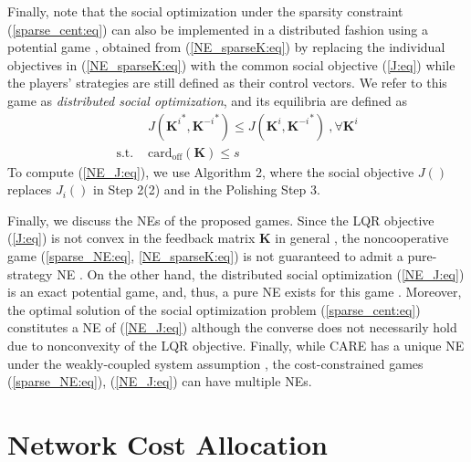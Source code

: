 \documentclass[12pt, draftclsnofoot,onecolumn]{IEEEtran}
\begin{document}
Finally, note that the social optimization under the sparsity constraint (\ref{sparse_cent:eq}) can also be implemented in a distributed fashion using a potential game \cite{li2013designing}, obtained from (\ref{NE_sparseK:eq}) by replacing the individual objectives in (\ref{NE_sparseK:eq}) with the common social objective (\ref{J:eq}) while the players' strategies are still defined as their control vectors. We refer to this game as {\it distributed social optimization}, and its equilibria are defined as
\begin{align}
&J({{\boldsymbol K}^{i}}^*,{{\boldsymbol K}^{-i}}^*) \leq J({\boldsymbol K}^{i},{{\boldsymbol K}^{-i}}^*) ~,\forall {\boldsymbol K}^{i}\nonumber\\
\mbox{s.t. } & \mathrm{card}_{\mathrm{off}}({\boldsymbol K}) \leq s 
\label{NE_J:eq}
\end{align}
\noindent To compute (\ref{NE_J:eq}), we use Algorithm 2, where the social objective $J()$ replaces $J_i()$ in Step 2(2) and in the Polishing Step 3. 


Finally, we discuss the NEs of the proposed games. Since the LQR objective (\ref{J:eq}) is not convex in the feedback matrix $\boldsymbol{K}$ in general \cite{rautert1997computational}, the noncooperative game (\ref{sparse_NE:eq}, \ref{NE_sparseK:eq}) is not guaranteed to admit a pure-strategy NE \cite{pang2011nonconvex}. On the other hand, the distributed social optimization (\ref{NE_J:eq}) is an exact potential game, and, thus, a pure NE exists for this game \cite{li2013designing}. Moreover, the optimal solution of the social optimization problem (\ref{sparse_cent:eq}) constitutes a NE of (\ref{NE_J:eq}) although the converse does not necessarily hold due to nonconvexity of the LQR objective. Finally, while CARE has a unique NE under the weakly-coupled system assumption \cite{Mukaidani2006}, the cost-constrained games (\ref{sparse_NE:eq}), (\ref{NE_J:eq}) can have multiple NEs.

 \section{Network Cost Allocation}
\label{network:sec}
\end{document}
